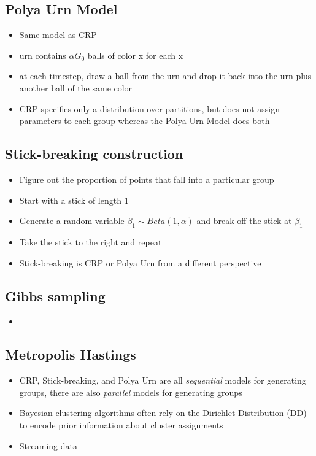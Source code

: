 \documentclass[../main.tex]{subfiles}
\begin{document}
  \subsection{Polya Urn Model}
  \begin{itemize}
    \item Same model as CRP
    \item urn contains $\alpha G_{0}$ balls of color x for each x
    \item at each timestep, draw a ball from the urn and drop it back into the urn plus another ball of the same color
    \item CRP specifies only a distribution over partitions, but does not assign parameters to each group whereas the Polya Urn Model does both
  \end{itemize}
  \subsection{Stick-breaking construction}
  \begin{itemize}
    \item Figure out the proportion of points that fall into a particular group
    \item Start with a stick of length 1
    \item Generate a random variable $\beta_{1} \sim Beta(1, \alpha)$ and break off the stick at $\beta_{1}$
    \item Take the stick to the right and repeat
    \item Stick-breaking is CRP or Polya Urn from a different perspective
  \end{itemize}



  \subsection{Gibbs sampling}
  \begin{itemize}
    \item
  \end{itemize}

  \subsection{Metropolis Hastings}

  \begin{itemize}
    \item CRP, Stick-breaking, and Polya Urn are all \textit{sequential} models for generating groups, there are also \textit{parallel} models for generating groups
    \item Bayesian clustering algorithms often rely on the Dirichlet Distribution (DD) to encode prior information about cluster assignments
    \item Streaming data
  \end{itemize}
\end{document}
